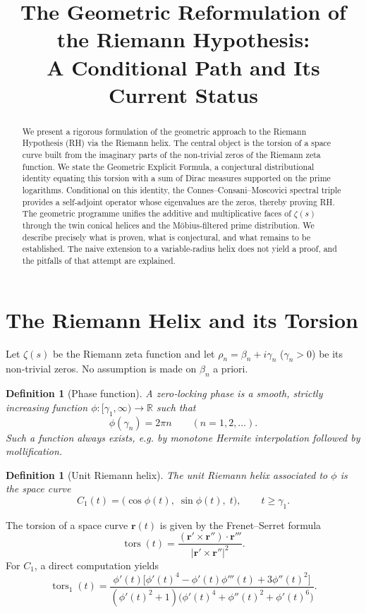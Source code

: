 \documentclass[12pt,a4paper]{article}
\title{\bf The Geometric Reformulation of the Riemann Hypothesis:\\ 
A Conditional Path and Its Current Status}
\author{}
\date{}
\newtheorem{definition}[theorem]{Definition}
\newcommand{\R}{\mathbb{R}}
\newcommand{\tors}{\operatorname{tors}}
\begin{document}
\maketitle

\begin{abstract}
We present a rigorous formulation of the geometric approach to the Riemann Hypothesis (RH) via the Riemann helix.  The central object is the torsion of a space curve built from the imaginary parts of the non‑trivial zeros of the Riemann zeta function.  We state the Geometric Explicit Formula, a conjectural distributional identity equating this torsion with a sum of Dirac measures supported on the prime logarithms.  Conditional on this identity, the Connes–Consani–Moscovici spectral triple provides a self‑adjoint operator whose eigenvalues are the zeros, thereby proving RH.  The geometric programme unifies the additive and multiplicative faces of $\zeta(s)$ through the twin conical helices and the M\"obius‑filtered prime distribution.  We describe precisely what is proven, what is conjectural, and what remains to be established.  The naive extension to a variable‑radius helix does not yield a proof, and the pitfalls of that attempt are explained.
\end{abstract}

\section{The Riemann Helix and its Torsion}

Let $\zeta(s)$ be the Riemann zeta function and let $\rho_n = \beta_n + i\gamma_n$ ($\gamma_n>0$) be its non‑trivial zeros.  No assumption is made on $\beta_n$ a priori.

\begin{definition}[Phase function]
A \emph{zero‑locking phase} is a smooth, strictly increasing function $\phi:[\gamma_1,\infty)\to\R$ such that
\[
\phi(\gamma_n) = 2\pi n \qquad (n=1,2,\dots).
\]
Such a function always exists, e.g. by monotone Hermite interpolation followed by mollification.
\end{definition}

\begin{definition}[Unit Riemann helix]
The \emph{unit Riemann helix} associated to $\phi$ is the space curve
\[
C_1(t) = \bigl( \cos\phi(t),\; \sin\phi(t),\; t \bigr), \qquad t \ge \gamma_1 .
\]
\end{definition}

The torsion of a space curve $\mathbf{r}(t)$ is given by the Frenet–Serret formula
\[
\tors(t) = \frac{(\mathbf{r}'\times\mathbf{r}'')\cdot\mathbf{r}'''}{|\mathbf{r}'\times\mathbf{r}''|^2}.
\]
For $C_1$, a direct computation yields
\[
\tors_1(t) = \frac{\phi'(t)\bigl[ \phi'(t)^4 - \phi'(t)\phi'''(t) + 3\phi''(t)^2 \bigr]}
                  {(\phi'(t)^2+1)\bigl( \phi'(t)^4 + \phi''(t)^2 + \phi'(t)^6 \bigr)} .
\tag{1}
\]
\end{document}
